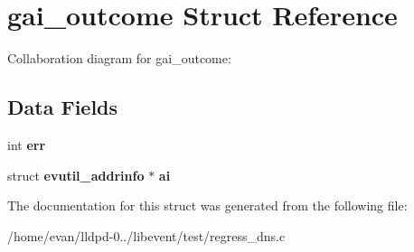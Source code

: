 \section{gai\-\_\-outcome \-Struct \-Reference}
\label{structgai__outcome}


\-Collaboration diagram for gai\-\_\-outcome\-:
\subsection*{\-Data \-Fields}
\begin{DoxyCompactItemize}
\item 
int {\bfseries err}\label{structgai__outcome_a6ce68847c12434f60d1b2654a3dc3409}

\item 
struct {\bf evutil\-\_\-addrinfo} $\ast$ {\bfseries ai}\label{structgai__outcome_a6f7c09239bc3f4a123be83d7863580b5}

\end{DoxyCompactItemize}


\-The documentation for this struct was generated from the following file\-:\begin{DoxyCompactItemize}
\item 
/home/evan/lldpd-\/0../libevent/test/regress\-\_\-dns.\-c\end{DoxyCompactItemize}
